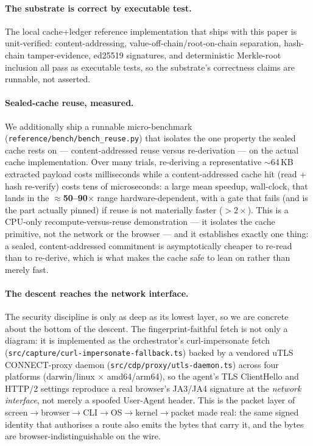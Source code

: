 \documentclass[11pt]{article}
\begin{document}
\paragraph{The substrate is correct by executable test.} The local cache+ledger
reference implementation that ships with this paper is unit-verified:
content-addressing, value-off-chain/root-on-chain separation, hash-chain
tamper-evidence, ed25519 signatures, and deterministic Merkle-root inclusion all
pass as executable tests, so the substrate's correctness claims are runnable, not
asserted.

\paragraph{Sealed-cache reuse, measured.} We additionally ship a runnable
micro-benchmark (\texttt{reference/bench/\allowbreak bench\_reuse.py}) that isolates the one
property the sealed cache rests on --- content-addressed reuse versus re-derivation
--- on the actual cache implementation. Over many trials, re-deriving a representative
$\sim$64\,KB extracted payload costs milliseconds while a content-addressed cache hit
(read + hash re-verify) costs tens of microseconds: a large mean speedup, wall-clock,
that lands in the \textbf{$\approx$50--90$\times$} range hardware-dependent, with a gate
that fails (and is the part actually pinned) if reuse is not materially faster
($>2\times$). This is a CPU-only
recompute-versus-reuse demonstration --- it isolates the cache primitive, not the
network or the browser --- and it establishes exactly one thing: a sealed,
content-addressed commitment is asymptotically cheaper to re-read than to
re-derive, which is what makes the cache safe to lean on rather than merely fast.

\paragraph{The descent reaches the network interface.} The security
discipline is only as deep as its lowest layer, so we are concrete about the bottom
of the descent. The fingerprint-faithful fetch is not only a diagram: it is
implemented as the
orchestrator's curl-impersonate fetch (\texttt{src/capture/curl-impersonate-fallback.ts})
backed by a vendored uTLS CONNECT-proxy daemon (\texttt{src/cdp/proxy/utls-daemon.ts})
across four platforms (darwin/linux $\times$ amd64/arm64), so the agent's TLS
ClientHello and HTTP/2 settings reproduce a real browser's JA3/JA4 signature at the
\emph{network interface}, not merely a spoofed User-Agent header.
This is the packet layer of
screen$\to$browser$\to$CLI$\to$OS$\to$kernel$\to$packet made real: the same signed
identity that authorises a route also emits the bytes that carry it, and the bytes
are browser-indistinguishable on the wire.
\end{document}
